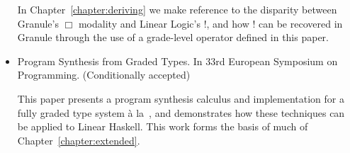 \begin{itemize}
    In Chapter~\ref{chapter:deriving} we make reference to
    the disparity between Granule's $\Box$ modality and Linear Logic's !, and
    how ! can be recovered in Granule through the use of a grade-level operator
    defined in this paper.  

    \item \citet{esop-synthesis} Program Synthesis from Graded Types. In 33rd
    European Symposium on Programming. (Conditionally accepted)
     
    This paper presents a program synthesis calculus and implementation for a
    fully graded type system à la~\citet{petricek2014coeffects}, and
    demonstrates how these techniques can be applied to Linear Haskell. This
    work forms the basis of much of Chapter~\ref{chapter:extended}.
\end{itemize}
